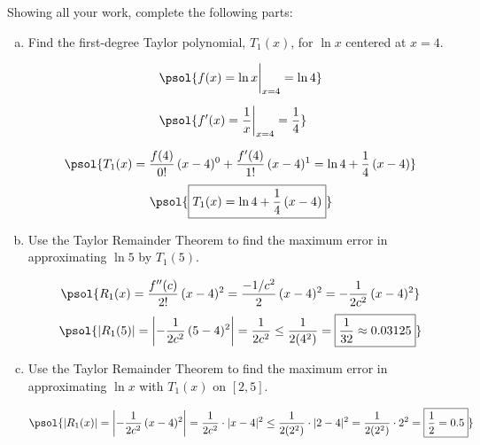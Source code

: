 \documentclass[12pt,letterpaper]{exam}
\begin{document}
\begin{questions}
\newpage
\question[16] Showing all your work, complete the following parts: 
	\begin{enumerate}[(a)]
	\item Find the first-degree Taylor polynomial, $T_1(x)$, for $\ln x$ centered at $x= 4$. \par\vspace{0.3cm}
		\[
		\begin{aligned}
		&\psol{f(x)= \ln x \bigg|_{x=4}= \ln 4} \\[0.2cm]
		&\psol{f'(x)= \dfrac{1}{x} \bigg|_{x=4}= \dfrac{1}{4}}
		\end{aligned}
		\] \par\vspace{0.2cm}
		\[
		\psol{T_1(x)= \dfrac{f(4)}{0!}\, (x - 4)^0 + \dfrac{f'(4)}{1!}\, (x - 4)^1= \ln 4 + \dfrac{1}{4} \, (x - 4)}
		\]
		\[
		\psol{\boxed{T_1(x)= \ln 4 + \dfrac{1}{4} \, (x - 4)}}
		\] \par\vspace{0.3cm}
	
	\item Use the Taylor Remainder Theorem to find the maximum error in approximating $\ln 5$  by $T_1(5)$. \par\vspace{0.3cm}
		\[
		\psol{R_1(x)= \dfrac{f''(c)}{2!} \,(x - 4)^2= \dfrac{-1/c^2}{2} \,(x - 4)^2= -\dfrac{1}{2c^2} \,(x - 4)^2}
		\]
		\[
		\psol{|R_1(5)|= \left| -\dfrac{1}{2c^2} \,(5 - 4)^2 \right|= \dfrac{1}{2c^2} \leq \dfrac{1}{2(4^2)}= \boxed{\dfrac{1}{32} \approx 0.03125}}
		\] \par\vspace{0.7cm}
	
	\item Use the Taylor Remainder Theorem to find the maximum error in approximating $\ln x$ with $T_1(x)$ on $[2, 5]$. \par\vspace{0.3cm}
		\[
		\psol{|R_1(x)|= \left| -\dfrac{1}{2c^2} \,(x - 4)^2 \right|= \dfrac{1}{2c^2} \cdot |x - 4|^2 \leq \dfrac{1}{2(2^2)} \cdot |2 - 4|^2= \dfrac{1}{2(2^2)} \cdot 2^2= \boxed{\dfrac{1}{2}= 0.5}}
		\]
	\end{enumerate}




\end{questions}
\end{document}
